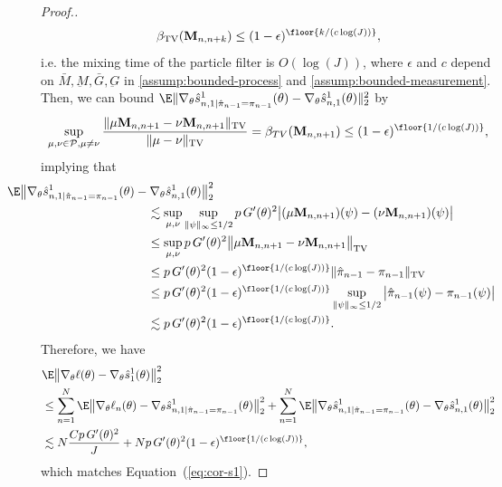 \begin{proof}[Proof.]
\begin{equation}
\beta_{\text{TV}}(\textbf{M}_{n,n+k}) \leq (1-\epsilon)^{\floor{k/(c\log(J))}},
\end{equation}
i.e. the mixing time of the particle filter is $O(\log(J))$, where $\epsilon$ and $c$ depend on $\bar{M}, \underbar{M}, \bar{G}, \underbar{G}$ in \ref{assump:bounded-process} and \ref{assump:bounded-measurement}. 
Then, we can bound 
$\E\|\nabla_\theta\hat s_{n,1|\hat\pi_{n-1}=\pi_{n-1}}^1(\theta) - \nabla_\theta\hat s_{n,1}^1(\theta)\|_2^2$ by
\begin{equation}
\sup _{\mu, \nu \in \mathcal{P}, \mu \neq \nu} \frac{\|\mu \textbf{M}_{n,n+1}-\nu \textbf{M}_{n,n+1}\|_{\mathrm{TV}}}{\|\mu-\nu\|_{\mathrm{TV}}} = \beta_{TV}(\textbf{M}_{n,n+1}) \leq (1-\epsilon)^{\floor{1/(c\log(J))}},
\end{equation}
implying that
\begin{align}
    & \hspace{-10mm}
    \E\big\|\nabla_\theta\hat s_{n,1|\hat\pi_{n-1}=\pi_{n-1}}^1(\theta) - \nabla_\theta\hat s_{n,1}^1(\theta)\big\|_2^2 
    \\ & \hspace{30mm}
    \lesssim \sup_{\mu, \nu} \sup_{\|\psi\|_\infty \leq 1/2} p \, G'(\theta)^2\big|(\mu \textbf{M}_{n,n+1})(\psi)-(\nu \textbf{M}_{n,n+1})(\psi)\big| 
    \\ & \hspace{30mm}
    \leq \sup_{\mu, \nu} p \, G'(\theta)^2\big\|\mu \textbf{M}_{n,n+1}-\nu \textbf{M}_{n,n+1}\big\|_{\mathrm{TV}} 
    \\ & \hspace{30mm}
    \leq p \, G'(\theta)^2(1-\epsilon)^{\floor{1/(c\log(J))}} \|\hat\pi_{n-1} - \pi_{n-1}\|_{\text{TV}} 
    \\ & \hspace{30mm}
    \leq p \, G'(\theta)^2(1-\epsilon)^{\floor{1/(c\log(J))}} \sup_{\|\psi\|_{\infty} \leq 1/2} \big|\hat\pi_{n-1}(\psi) - \pi_{n-1}(\psi)\big| 
    \\ & \hspace{30mm}
    \lesssim p \, G'(\theta)^2(1-\epsilon)^{\floor{1/(c\log(J))}}.
\end{align}
Therefore, we have 
\begin{align}
    &\E\big\|\nabla_\theta\ell(\theta) - \nabla_\theta\hat s_1^1(\theta)\big\|_2^2
    \nonumber \\
    &\leq \sum_{n=1}^N \E\big\|\nabla_\theta\ell_n(\theta) - \nabla_\theta\hat s_{n,1|\hat\pi_{n-1}=\pi_{n-1}}^1(\theta)\big\|_2^2 + \sum_{n=1}^N \E\big\|\nabla_\theta\hat s_{n,1|\hat\pi_{n-1}=\pi_{n-1}}^1(\theta) - \nabla_\theta\hat s_{n,1}^1(\theta)\big\|_2^2
    \nonumber \\
    &\lesssim N\frac{Cp \, G'(\theta)^2}{J} + Np \, G'(\theta)^2(1-\epsilon)^{\floor{1/(c\log(J))}},
\end{align}
which matches Equation~(\ref{eq:cor-s1}).
\end{proof}
